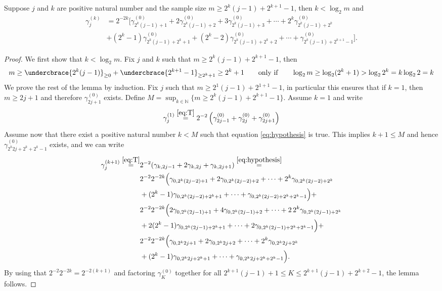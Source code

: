 \documentclass[11pt,english,a4paper]{article}
\begin{document}
\begin{lemma}
Suppose $j$ and $k$ are positive natural number and the sample size $m \geq 2^k(j-1) + 2^{k+1} - 1$, then $k < \log_2 m$ and
\begin{align}
\gamma_{j}^{(k)} &= 2^{-2k} \Big[ \gamma_{2^k(j-1)+1}^{(0)} + 2\gamma_{2^k(j-1)+2}^{(0)} +3\gamma_{2^k(j-1)+3}^{(0)} + \cdots + 2^k\gamma_{2^k(j-1)+2^k}^{(0)} \nonumber \\
&+ (2^k -1) \gamma_{2^k(j-1)+2^k + 1}^{(0)} + (2^k -2) \gamma_{2^k(j-1)+2^k + 2}^{(0)} + \cdots + \gamma_{2^k(j-1)+2^{k+1} - 1}^{(0)} \Big] . \label{eq:hypothesis}
\end{align}
\end{lemma}
\begin{proof}
We first show that $k < \log_2 m$. Fix $j$ and $k$ such that $m \geq 2^k(j-1) + 2^{k+1} - 1$, then
\[
m \geq \undercbrace{2^k(j-1)}_{\geq 0} + \undercbrace{2^{k+1} - 1}_{\geq 2^k +1} \geq 2^k + 1 \qquad \text{only if} \qquad \log_2m \geq \log_2(2^k + 1) > \log_2 2^k = k \log_2 2 = k
\]
We prove the rest of the lemma by induction. Fix $j$ such that $m \geq 2^1(j-1) + 2^{1+1} - 1$, in particular this ensures that if $k = 1$, then $m \geq 2j + 1$ and therefore $\gamma_{2j+1}^{(0)}$ exists. Define $M = \sup_{k \in \mathbb{N}} \{m \geq 2^k(j-1) + 2^{k+1} - 1\}$. Assume $k=1$ and write
\[
\gamma_{j}^{(1)} \stackrel{\eqref{eq:T}}{=} 2^{-2} \left( \gamma_{2j-1}^{(0)} + \gamma_{2j}^{(0)} + \gamma_{2j+1}^{(0)} \right)
\]
Assume now that there exist a positive natural number $k < M$ such that equation \eqref{eq:hypothesis} is true. This implies $k+1 \leq M$ and hence $\gamma_{2^k2j+2^k+2^k-1}^{(0)}$ exists, and we can write
\begin{align*} 
\gamma_{j}^{(k+1)} \stackrel{\eqref{eq:T}}{=} &2^{-2} (\gamma_{  k,2j-1} + 2\gamma_{  k,2j} + \gamma_{  k,2j+1}) \stackrel{\eqref{eq:hypothesis}}{=} \\
&2^{-2} 2^{-2k}\Big( \gamma_{0,2^k(2j-2)+1} + 2\gamma_{0,2^k(2j-2)+2} + \cdots + 2^k\gamma_{0,2^k(2j-2)+2^k} \\
&+ (2^k-1)\gamma_{0,2^k(2j-2)+2^k+1} + \cdots + \gamma_{0,2^k(2j-2)+2^k+2^k-1}
\Big) + \\
&2^{-2} 2^{-2k}\Big( 2\gamma_{0,2^k(2j-1)+1} + 4\gamma_{0,2^k(2j-1)+2} + \cdots + 2\,2^k\gamma_{0,2^k(2j-1)+2^k} \\
&+ 2(2^k-1)\gamma_{0,2^k(2j-1)+2^k+1} + \cdots + 2\gamma_{0,2^k(2j-1)+2^k+2^k-1}
\Big) + \\
&2^{-2} 2^{-2k}\Big( \gamma_{0,2^k2j+1} + 2\gamma_{0,2^k2j+2} + \cdots + 2^k\gamma_{0,2^k2j +2^k} \\
&+ (2^k-1)\gamma_{0,2^k2j+2^k+1} + \cdots + \gamma_{0,2^k2j+2^k+2^k-1}
\Big).
\end{align*}
By using that $2^{-2} 2^{-2k} = 2^{-2(k+1)}$ and factoring $\gamma_{K}^{(0)}$ together for all $2^{k+1}(j-1) + 1 \leq K \leq 2^{k+1}(j-1) + 2^{k+2}-1$, the lemma follows.
\end{proof}
\end{document}
